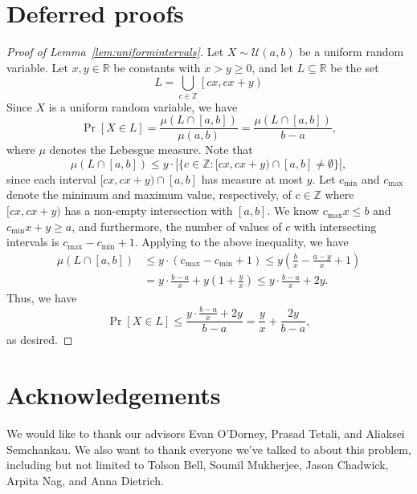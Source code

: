 \documentclass{article}
\newcommand{\Z}{\mathbb{Z}}
\theoremstyle{definition}
\theoremstyle{remark}
\numberwithin{equation}{section}
\numberwithin{case}{theorem}
\begin{document}
\appendix
\section{Deferred proofs}
\begin{proof}[Proof of Lemma~\ref{lem:uniformintervals}]
    Let $X \sim \mathcal{U}(a, b)$ be a uniform random variable. Let $x, y \in \mathbb{R}$ be constants with $x > y \geq 0$, and let $L \subseteq \mathbb{R}$ be the set
    \[
        L = \bigcup_{c \in \Z} \left[ cx, cx + y \right)
    \]
    Since $X$ is a uniform random variable, we have
    \[
        \Pr[X \in L] = \frac{\mu(L \cap [a, b])}{\mu(a, b)} = \frac{\mu(L \cap [a, b])}{b - a},
    \]
    where $\mu$ denotes the Lebesgue measure. Note that
    \[
        \mu(L \cap [a, b]) \leq y \cdot | \{ c \in \Z : [cx, cx + y) \cap [a, b] \neq \emptyset \} |,
    \]
    since each interval $[cx, cx + y) \cap [a, b]$ has measure at most $y$. Let $c_{\min}$ and $c_{\max}$ denote the minimum and maximum value, respectively, of $c \in \Z$ where $[cx, cx + y)$ has a non-empty intersection with $[a, b]$. We know $c_{\max} x \leq b$ and $c_{\min} x + y \geq a$, and furthermore, the number of values of $c$ with intersecting intervals is $c_{\max} - c_{\min} + 1$. Applying to the above inequality, we have
    \begin{align*}
        \mu(L \cap [a, b]) &\leq y \cdot (c_{\max} - c_{\min} + 1) \leq y \left(\frac{b}{x} - \frac{a-y}{x} + 1 \right) \\
        &= y \cdot \frac{b-a}{x} + y\left(1 + \frac{y}{x}\right) \leq y \cdot \frac{b-a}{x} + 2y.
    \end{align*}
    Thus, we have
    \[
        \Pr[X \in L] \leq \frac{y \cdot \frac{b-a}{x} + 2y}{b-a} = \frac{y}{x} + \frac{2y}{b-a},
    \]
    as desired.
\end{proof}
\section{Acknowledgements}
We would like to thank our advisors Evan O'Dorney, Prasad Tetali, and Aliaksei Semchankau. We also want to thank everyone we've talked to about this problem, including but not limited to Tolson Bell, Soumil Mukherjee, Jason Chadwick, Arpita Nag, and Anna Dietrich. 


\end{document}
